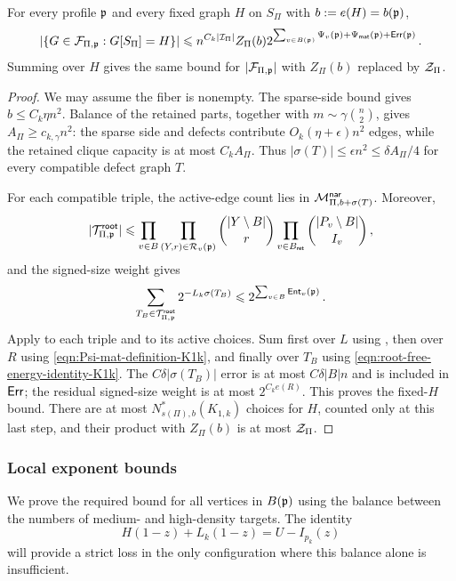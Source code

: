 \begin{lemma}\label{lemma:profile-bound-K1k}
For every profile ${\mathfrak p}$ and every fixed graph $H$ on $S_\Pi$ with $b:=e(H)=b({\mathfrak p})$,
$$|\{G\in{\mathcal F}_{\Pi,{\mathfrak p}}:G[S_\Pi]=H\}|\leqslant n^{C_k|{\mathcal I}_\Pi|}Z_\Pi(b)2^{\sum_{v\in B({\mathfrak p})}\Psi_v({\mathfrak p})+\Psi_{\mathsf{mat}}({\mathfrak p})+{\mathsf{Err}}({\mathfrak p})}\,.$$
Summing over $H$ gives the same bound for $|{\mathcal F}_{\Pi,{\mathfrak p}}|$ with $Z_\Pi(b)$ replaced by ${\mathcal Z}_\Pi$.
\end{lemma}
\begin{proof}
We may assume the fiber is nonempty. The sparse-side bound gives $b\leq C_k\eta n^2$. Balance of the retained parts, together with $m\sim\gamma\binom n2$, gives $A_\Pi\geq c_{k,\gamma}n^2$: the sparse side and defects contribute $O_k(\eta+\epsilon)n^2$ edges, while the retained clique capacity is at most $C_kA_\Pi$. Thus $|\sigma(T)|\leq\epsilon n^2\leq\delta A_\Pi/4$ for every compatible defect graph $T$.

For each compatible triple, the active-edge count lies in ${\mathcal M}^{\mathsf{nar}}_{\Pi,b+\sigma(T)}$. Moreover,
\begin{equation}\label{eqn:troot-bound}
|{\mathcal T}^{\mathsf{root}}_{\Pi,{\mathfrak p}}|\leqslant\prod_{v\in B}\prod_{(Y,r)\in{\mathcal R}_v({\mathfrak p})}\binom{|Y\setminus B|}{r}\prod_{v\in B_{\mathsf{ret}}}\binom{|P_v\setminus B|}{I_v}\,,
\end{equation}
and the signed-size weight gives
\begin{equation}\label{eqn:root-free-energy-identity-K1k}
\sum_{T_B\in{\mathcal T}^{\mathsf{root}}_{\Pi,{\mathfrak p}}}2^{-L_k\sigma(T_B)}\leqslant2^{\sum_{v\in B}{\mathsf{Ent}}_v({\mathfrak p})}\,.
\end{equation}
Apply  to each triple and  to its active choices. Sum first over $L$ using , then over $R$ using \eqref{eqn:Psi-mat-definition-K1k}, and finally over $T_B$ using \eqref{eqn:root-free-energy-identity-K1k}. The $C\delta|\sigma(T_B)|$ error is at most $C\delta|B|n$ and is included in ${\mathsf{Err}}$; the residual signed-size weight is at most $2^{C_ke(R)}$. This proves the fixed-$H$ bound. There are at most $N^\ast_{s(\Pi),b}(K_{1,k})$ choices for $H$, counted only at this last step, and their product with $Z_\Pi(b)$ is at most ${\mathcal Z}_\Pi$.
\end{proof}

\subsubsection{Local exponent bounds}\label{subsec:local-exponent-bounds}
We prove the required bound for all vertices in $B({\mathfrak p})$ using the balance between the numbers of medium- and high-density targets. The identity
\begin{equation}\label{eqn:local-own-entropy-K1k}
H(1-z)+L_k(1-z)=U-I_{p_k}(z)
\end{equation}
will provide a strict loss in the only configuration where this balance alone is insufficient.

